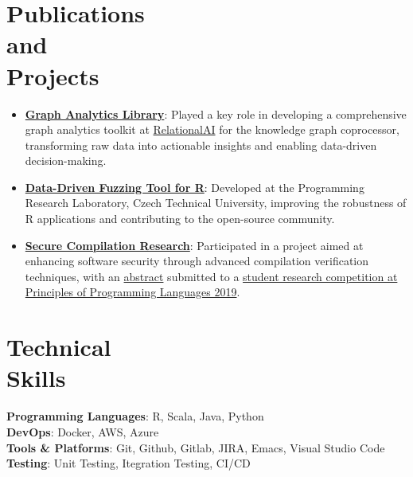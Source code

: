 \documentclass[margin,line]{resume}
\newcommand\mymedskip{10pt}
\begin{document}
\begin{resume}
    \section{\mysidestyle Publications \\and \\Projects}
    \begin{itemize}
        \item \href{https://docs.relational.ai/preview/graph-analytics/overview}{\textbf{Graph Analytics Library}}: Played a key role in developing a comprehensive graph analytics toolkit at \href{https://relational.ai/}{RelationalAI} for the knowledge graph coprocessor, transforming raw data into actionable insights and enabling data-driven decision-making.
        \item \href{https://github.com/PRL-PRG/sle22-signatr-artifact}{\textbf{Data-Driven Fuzzing Tool for R}}: Developed at the Programming Research Laboratory, Czech Technical University, improving the robustness of R applications and contributing to the open-source community.
        \item \href{https://www.khoury.northeastern.edu/research_projects/shf-small-secure-compilation-of-advanced-languages/}{\textbf{Secure Compilation Research}}: Participated in a project aimed at enhancing software security through advanced compilation verification techniques, with an \href{https://github.com/hyeyoungshin/popl19src/blob/master/popl19src.pdf}{abstract} submitted to a \href{https://popl19.sigplan.org/track/POPL-2019-Student-Research-Competition?}{student research competition at Principles of Programming Languages 2019}.
    \end{itemize}

    
    \section{\mysidestyle Technical\\Skills}
    \textbf{Programming Languages}: R, Scala, Java, Python\\[\mymedskip]
    \textbf{DevOps}: Docker, AWS, Azure\\[\mymedskip]
    \textbf{Tools \& Platforms}: Git, Github, Gitlab, JIRA, Emacs, Visual Studio Code\\[\mymedskip]
    \textbf{Testing}: Unit Testing, Itegration Testing, CI/CD
    


\end{resume}
\end{document}
